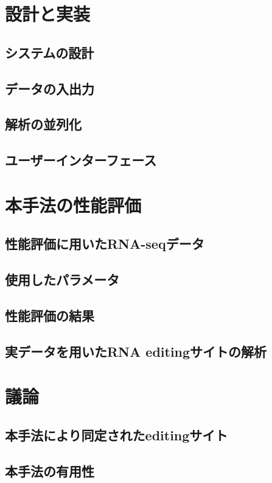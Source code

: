 \section{設計と実装}
\subsection{システムの設計}
\subsection{データの入出力}
\subsection{解析の並列化}
\subsection{ユーザーインターフェース}

\section{本手法の性能評価}
\subsection{性能評価に用いたRNA-seqデータ}
\subsection{使用したパラメータ}
\subsection{性能評価の結果}
\subsection{実データを用いたRNA editingサイトの解析}

\section{議論}
\subsection{本手法により同定されたeditingサイト}
\subsection{本手法の有用性}
